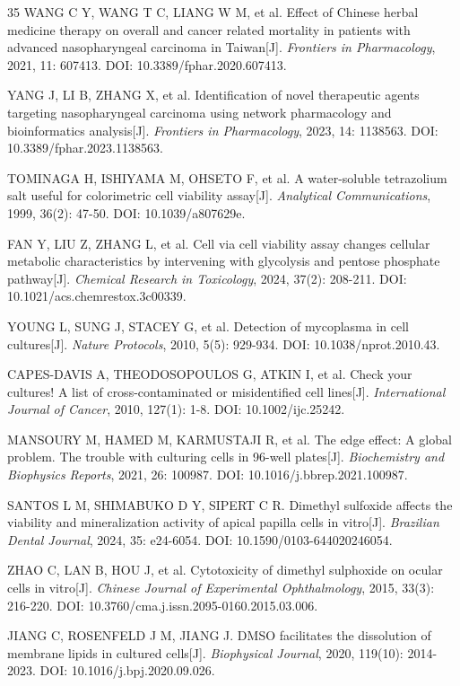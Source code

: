 \documentclass[12pt,a4paper]{article}
\begin{document}
{\begin{thebibliography}{35}
 WANG C Y, WANG T C, LIANG W M, et al. Effect of Chinese herbal medicine therapy on overall and cancer related mortality in patients with advanced nasopharyngeal carcinoma in Taiwan[J]. \textit{Frontiers in Pharmacology}, 2021, 11: 607413. DOI: 10.3389/fphar.2020.607413.

 YANG J, LI B, ZHANG X, et al. Identification of novel therapeutic agents targeting nasopharyngeal carcinoma using network pharmacology and bioinformatics analysis[J]. \textit{Frontiers in Pharmacology}, 2023, 14: 1138563. DOI: 10.3389/fphar.2023.1138563.

 TOMINAGA H, ISHIYAMA M, OHSETO F, et al. A water-soluble tetrazolium salt useful for colorimetric cell viability assay[J]. \textit{Analytical Communications}, 1999, 36(2): 47-50. DOI: 10.1039/a807629e.

 FAN Y, LIU Z, ZHANG L, et al. Cell via cell viability assay changes cellular metabolic characteristics by intervening with glycolysis and pentose phosphate pathway[J]. \textit{Chemical Research in Toxicology}, 2024, 37(2): 208-211. DOI: 10.1021/acs.chemrestox.3c00339.

 YOUNG L, SUNG J, STACEY G, et al. Detection of mycoplasma in cell cultures[J]. \textit{Nature Protocols}, 2010, 5(5): 929-934. DOI: 10.1038/nprot.2010.43.

 CAPES-DAVIS A, THEODOSOPOULOS G, ATKIN I, et al. Check your cultures! A list of cross-contaminated or misidentified cell lines[J]. \textit{International Journal of Cancer}, 2010, 127(1): 1-8. DOI: 10.1002/ijc.25242.

 MANSOURY M, HAMED M, KARMUSTAJI R, et al. The edge effect: A global problem. The trouble with culturing cells in 96-well plates[J]. \textit{Biochemistry and Biophysics Reports}, 2021, 26: 100987. DOI: 10.1016/j.bbrep.2021.100987.

 SANTOS L M, SHIMABUKO D Y, SIPERT C R. Dimethyl sulfoxide affects the viability and mineralization activity of apical papilla cells in vitro[J]. \textit{Brazilian Dental Journal}, 2024, 35: e24-6054. DOI: 10.1590/0103-644020246054.

 ZHAO C, LAN B, HOU J, et al. Cytotoxicity of dimethyl sulphoxide on ocular cells in vitro[J]. \textit{Chinese Journal of Experimental Ophthalmology}, 2015, 33(3): 216-220. DOI: 10.3760/cma.j.issn.2095-0160.2015.03.006.

 JIANG C, ROSENFELD J M, JIANG J. DMSO facilitates the dissolution of membrane lipids in cultured cells[J]. \textit{Biophysical Journal}, 2020, 119(10): 2014-2023. DOI: 10.1016/j.bpj.2020.09.026.


\end{thebibliography}}
\end{document}
